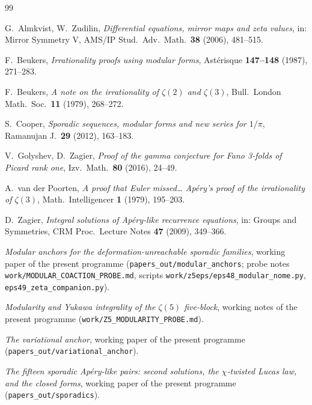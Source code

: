 \documentclass[11pt,reqno]{amsart}
\theoremstyle{plain}
\theoremstyle{definition}
\theoremstyle{remark}
\numberwithin{equation}{section}
\begin{document}
\begin{thebibliography}{99}
\sloppy

 G.~Almkvist, W.~Zudilin,
\emph{Differential equations, mirror maps and zeta values},
in: Mirror Symmetry V, AMS/IP Stud.\ Adv.\ Math.\ \textbf{38} (2006), 481--515.

 F.~Beukers,
\emph{Irrationality proofs using modular forms},
Ast\'erisque \textbf{147--148} (1987), 271--283.

 F.~Beukers,
\emph{A note on the irrationality of $\zeta(2)$ and $\zeta(3)$},
Bull.\ London Math.\ Soc.\ \textbf{11} (1979), 268--272.

 S.~Cooper,
\emph{Sporadic sequences, modular forms and new series for $1/\pi$},
Ramanujan J.\ \textbf{29} (2012), 163--183.

 V.~Golyshev, D.~Zagier,
\emph{Proof of the gamma conjecture for Fano 3-folds of Picard rank one},
Izv.\ Math.\ \textbf{80} (2016), 24--49.

 A.~van der Poorten,
\emph{A proof that Euler missed\dots{} Ap\'ery's proof of the irrationality of
$\zeta(3)$}, Math.\ Intelligencer \textbf{1} (1979), 195--203.

 D.~Zagier,
\emph{Integral solutions of Ap\'ery-like recurrence equations},
in: Groups and Symmetries, CRM Proc.\ Lecture Notes \textbf{47} (2009), 349--366.

 \emph{Modular anchors for the deformation-unreachable
sporadic families}, working paper of the present programme
(\texttt{papers\_out/modular\_anchors}; probe notes
\texttt{work/MODULAR\_COACTION\_PROBE.md}, scripts
\texttt{work/z5eps/eps48\_modular\_nome.py},
\texttt{eps49\_zeta\_companion.py}).

 \emph{Modularity and Yukawa integrality of the $\zeta(5)$
five-block}, working notes of the present programme
(\texttt{work/Z5\_MODULARITY\_PROBE.md}).

 \emph{The variational anchor}, working paper of the present
programme (\texttt{papers\_out/variational\_anchor}).

 \emph{The fifteen sporadic Ap\'ery-like pairs: second
solutions, the $\chi$-twisted Lucas law, and the closed forms}, working paper of
the present programme (\texttt{papers\_out/sporadics}).

\end{thebibliography}
\end{document}
